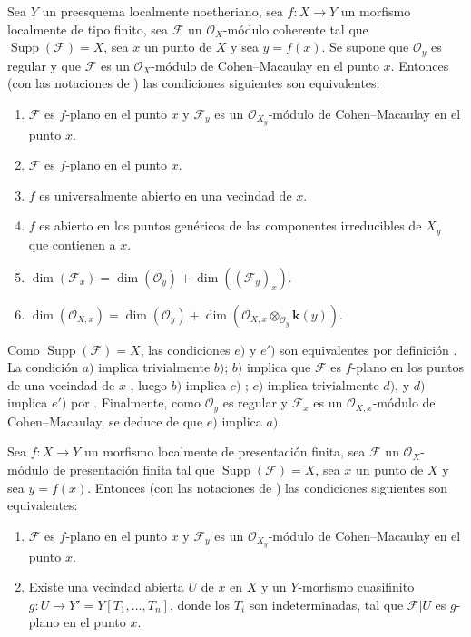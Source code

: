 \begin{proposition}[15.4.2]
\label{IV.15.4.2}
Sea $Y$ un preesquema localmente noetheriano, sea $f:X\to Y$ un morfismo localmente de tipo finito, sea $\mathcal F$ un $\mathcal O_X$-módulo coherente tal que $\operatorname{Supp}(\mathcal F)=X$, sea $x$ un punto de $X$ y sea $y=f(x)$.
Se supone que $\mathcal O_y$ es regular y que $\mathcal F$ es un $\mathcal O_X$-módulo de Cohen--Macaulay en el punto $x$.
Entonces \textup{(con las notaciones de )} las condiciones siguientes son equivalentes:
\begin{enumerate}[label=\emph{\alph*})]
  \item $\mathcal F$ es $f$-plano en el punto $x$ y $\mathcal F_y$ es un $\mathcal O_{X_y}$-módulo de Cohen--Macaulay en el punto $x$.
  \item $\mathcal F$ es $f$-plano en el punto $x$.
  \item $f$ es universalmente abierto en una vecindad de $x$.
  \item $f$ es abierto en los puntos genéricos de las componentes irreducibles de $X_y$ que contienen a $x$.
  \item $\dim(\mathcal F_x)=\dim(\mathcal O_y)+\dim((\mathcal F_y)_x)$.
  \item[\emph{e}$'$)] $\dim(\mathcal O_{X,x})=\dim(\mathcal O_y)+
  \dim(\mathcal O_{X,x}\otimes_{\mathcal O_y}\boldsymbol{k}(y))$.
\end{enumerate}
\end{proposition}

Como $\operatorname{Supp}(\mathcal F)=X$, las condiciones $e)$ y $e')$ son equivalentes por definición .
La condición $a)$ implica trivialmente $b)$; $b)$ implica que $\mathcal F$ es $f$-plano en los puntos de una vecindad de $x$ , luego $b)$ implica $c)$ ; $c)$ implica trivialmente $d)$, y $d)$ implica $e')$ por .
Finalmente, como $\mathcal O_y$ es regular y $\mathcal F_x$ es un $\mathcal O_{X,x}$-módulo de Cohen--Macaulay, se deduce de  que $e)$ implica $a)$.


\begin{proposition}[15.4.3]
\label{IV.15.4.3}
Sea $f:X\to Y$ un morfismo localmente de presentación finita, sea $\mathcal F$ un $\mathcal O_X$-módulo de presentación finita tal que $\operatorname{Supp}(\mathcal F)=X$, sea $x$ un punto de $X$ y sea $y=f(x)$.
Entonces \textup{(con las notaciones de )} las condiciones siguientes son equivalentes:
\begin{enumerate}[label=\emph{\alph*})]
  \item $\mathcal F$ es $f$-plano en el punto $x$ y $\mathcal F_y$ es un $\mathcal O_{X_y}$-módulo de Cohen--Macaulay en el punto $x$.
  \item Existe una vecindad abierta $U$ de $x$ en $X$ y un $Y$-morfismo cuasifinito $g:U\to Y'=Y[T_1,\ldots,T_n]$, donde los $T_i$ son indeterminadas, tal que $\mathcal F|U$ es $g$-plano en el punto $x$.
\end{enumerate}
\end{proposition}


